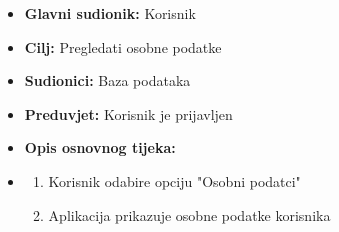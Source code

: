                         \noindent {}
					\begin{itemize}
	
						\item \textbf{Glavni sudionik: }Korisnik
						\item  \textbf{Cilj:} Pregledati osobne podatke
						\item  \textbf{Sudionici:} Baza podataka
						\item  \textbf{Preduvjet:} Korisnik je prijavljen
						\item  \textbf{Opis osnovnog tijeka:}
						
						\item[] \begin{enumerate}
							\item Korisnik odabire opciju "Osobni podatci"
                                \item Aplikacija prikazuje osobne podatke korisnika\\
						\end{enumerate}
			
						
					\end{itemize}

